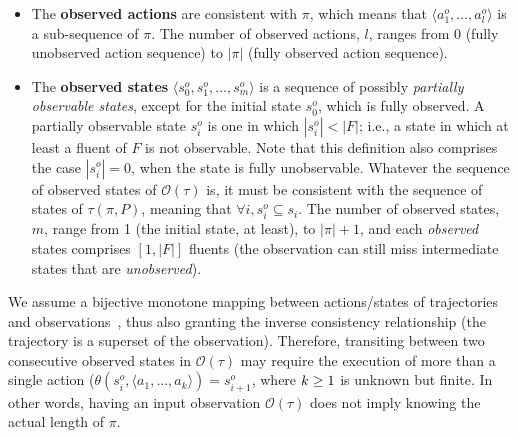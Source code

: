 \documentclass{article}
\newcommand{\tup}[1]{{\langle #1 \rangle}}
\begin{document}
\begin{itemize}
\item The {\bf observed actions} are consistent with $\pi$, which means that $\tup{a_1^o, \ldots, a_l^o}$ is a sub-sequence of $\pi$. The number of observed actions, $l$, ranges from $0$ (fully unobserved action sequence) to $|\pi|$ (fully observed action sequence).
\item The {\bf observed states} $\tup{s_0^o, s_1^o, \ldots, s_m^o}$ is a sequence of possibly {\em partially observable states}, except for the initial state $s_0^o$, which is fully observed. A partially observable state $s_i^o$ is one in which $|s_i^o| < |F|$; i.e., a state in which at least a fluent of $F$ is not observable. Note that this definition also comprises the case $|s_i^o| = 0$, when the state is fully unobservable. Whatever the sequence of observed states of $\mathcal{O}(\tau)$ is, it must be consistent with the sequence of states of $\tau(\pi,P)$, meaning that $\forall i, s_i^o \subseteq s_i$. The number of observed states, $m$, range from 1 (the initial state, at least), to $|\pi|+1$, and each {\em observed} states comprises $[1,|F|]$ fluents (the observation can still miss intermediate states that are {\em unobserved}).
\end{itemize}

We assume a bijective monotone mapping between actions/states of trajectories and observations~\cite{ramirez2009plan}, thus also granting the inverse consistency relationship (the trajectory is a superset of the observation). Therefore, transiting between two consecutive observed states in $\mathcal{O}(\tau)$ may require the execution of more than a single action ($\theta(s_i^o,\tup{a_1,\ldots,a_k})=s_{i+1}^o$, where ${\small k\geq 1}$ is unknown but finite. In other words, having an input observation $\mathcal{O}(\tau)$ does not imply knowing the actual length of $\pi$.
\end{document}
